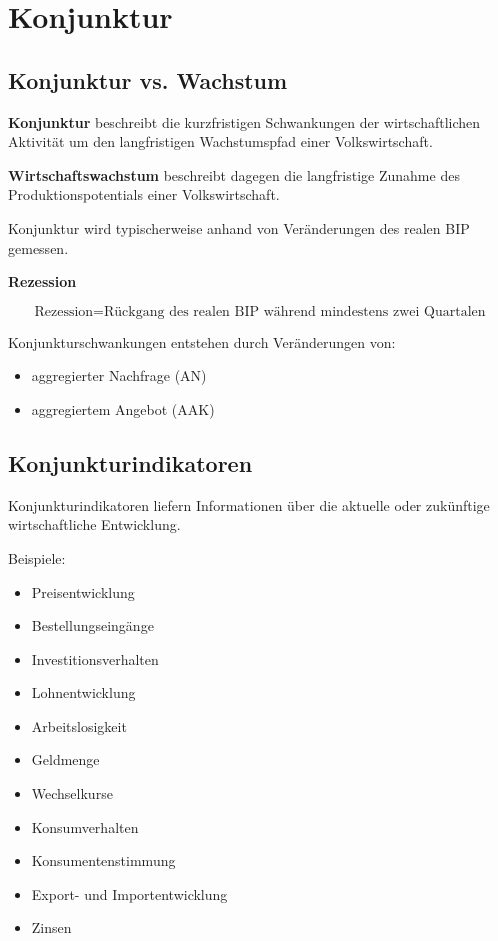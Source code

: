 \section{Konjunktur}

\subsection{Konjunktur vs. Wachstum}

\textbf{Konjunktur} beschreibt die kurzfristigen Schwankungen der wirtschaftlichen Aktivität 
um den langfristigen Wachstumspfad einer Volkswirtschaft.

\textbf{Wirtschaftswachstum} beschreibt dagegen die langfristige Zunahme des 
Produktionspotentials einer Volkswirtschaft.

Konjunktur wird typischerweise anhand von Veränderungen des realen BIP gemessen.

\textbf{Rezession}

\[
\text{Rezession} = \text{Rückgang des realen BIP während mindestens zwei Quartalen}
\]

Konjunkturschwankungen entstehen durch Veränderungen von:

\begin{itemize}
\item aggregierter Nachfrage (AN)
\item aggregiertem Angebot (AAK)
\end{itemize}


\subsection{Konjunkturindikatoren}

Konjunkturindikatoren liefern Informationen über die aktuelle oder zukünftige wirtschaftliche Entwicklung.

Beispiele:

\begin{itemize}
\item Preisentwicklung
\item Bestellungseingänge
\item Investitionsverhalten
\item Lohnentwicklung
\item Arbeitslosigkeit
\item Geldmenge
\item Wechselkurse
\item Konsumverhalten
\item Konsumentenstimmung
\item Export- und Importentwicklung
\item Zinsen
\end{itemize}

